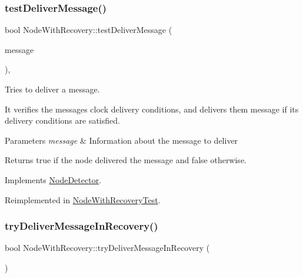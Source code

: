 \mbox{\label{class_node_with_recovery_aec147b3723b3dab00f9610453ba8daba}} 
\subsubsection{\texorpdfstring{test\+Deliver\+Message()}{testDeliverMessage()}}
{\footnotesize\ttfamily bool Node\+With\+Recovery\+::test\+Deliver\+Message (\begin{DoxyParamCaption}\item[{const \hyperlink{structures_8h_a7e7bdc1d2fff8a9436f2f352b2711ed6}{message\+Info} \&}]{message }\end{DoxyParamCaption})\hspace{0.3cm}{\ttfamily [protected]}, {\ttfamily [virtual]}}



Tries to deliver a message. 

It verifies the message\textquotesingle{}s clock delivery conditions, and delivers them message if its delivery conditions are satisfied. 
\begin{DoxyParams}{Parameters}
{\em message} & Information about the message to deliver \\
\hline
\end{DoxyParams}
\begin{DoxyReturn}{Returns}
true if the node delivered the message and false otherwise. 
\end{DoxyReturn}


Implements \hyperlink{class_node_detector_a51e7dccd54e94bbe937752ca39dfdba4}{Node\+Detector}.



Reimplemented in \hyperlink{class_node_with_recovery_test_af9b78d0ed4fefb97e2f54c9279aa4655}{Node\+With\+Recovery\+Test}.

\mbox{\label{class_node_with_recovery_a87a1ce8071c9c587b878636f79163e7e}} 
\subsubsection{\texorpdfstring{try\+Deliver\+Message\+In\+Recovery()}{tryDeliverMessageInRecovery()}}
{\footnotesize\ttfamily bool Node\+With\+Recovery\+::try\+Deliver\+Message\+In\+Recovery (\begin{DoxyParamCaption}{ }\end{DoxyParamCaption})\hspace{0.3cm}{\ttfamily [protected]}}

